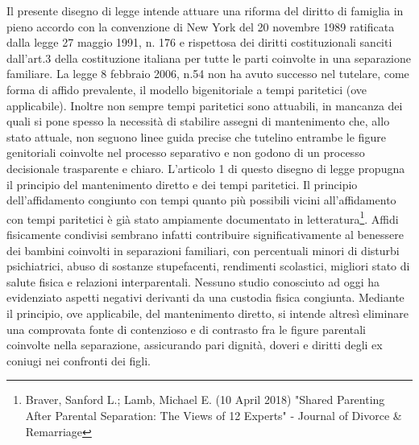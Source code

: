 \documentclass[twocolumn,12pt]{article}
\begin{document}
\setlength{\columnseprule}{0.4pt}

\noindent Il presente disegno di legge intende attuare una riforma del diritto di famiglia in pieno accordo con la convenzione di New York del 20 novembre 1989 ratificata dalla legge 27 maggio 1991, n. 176 e rispettosa dei diritti costituzionali sanciti dall'art.3 della costituzione italiana per tutte le parti coinvolte in una separazione familiare.
\bigbreak
La legge 8 febbraio 2006, n.54 non ha avuto successo nel tutelare, come forma di affido prevalente, il modello bigenitoriale a tempi paritetici (ove applicabile). Inoltre non sempre tempi paritetici sono attuabili, in mancanza dei quali si pone spesso la necessità di stabilire assegni di mantenimento che, allo stato attuale, non seguono linee guida precise che tutelino entrambe le figure genitoriali coinvolte nel processo separativo e non godono di un processo decisionale trasparente e chiaro.
\bigbreak
L'articolo 1 di questo disegno di legge propugna il principio del mantenimento diretto e dei tempi paritetici. Il principio dell'affidamento congiunto con tempi quanto più possibili vicini all'affidamento con tempi paritetici è già stato ampiamente documentato in letteratura\footnote{Braver, Sanford L.; Lamb, Michael E. (10 April 2018) "Shared Parenting After Parental Separation: The Views of 12 Experts" - Journal of Divorce \& Remarriage}. Affidi fisicamente condivisi sembrano infatti contribuire significativamente al benessere dei bambini coinvolti in separazioni familiari, con percentuali minori di disturbi psichiatrici, abuso di sostanze stupefacenti, rendimenti scolastici, migliori stato di salute fisica e relazioni interparentali. Nessuno studio conosciuto ad oggi ha evidenziato aspetti negativi derivanti da una custodia fisica congiunta. Mediante il principio, ove applicabile, del mantenimento diretto, si intende altresì eliminare una comprovata fonte di contenzioso e di contrasto fra le figure parentali coinvolte nella separazione, assicurando pari dignità, doveri e diritti degli ex coniugi nei confronti dei figli.
\bigbreak
\end{document}
